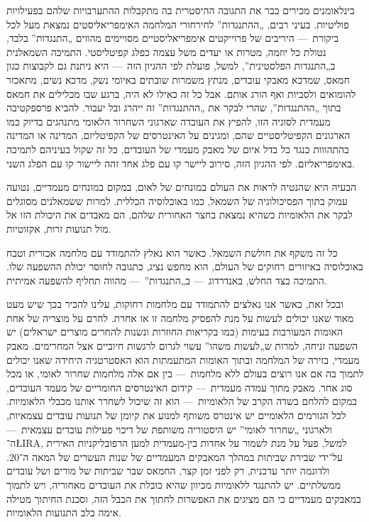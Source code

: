 בינלאומנים מכירים כבר את התגובה ההיסטרית בה מתקבלות ההתערבויות שלהם בפעילויות פוליטיות. בעיני רבים, „ההתנגדות” לחירחורי המלחמה האימפריאליסטים נמצאת מעל לכל ביקורת~— היריבים של פרוייקטים אימפריאליסטיים מסויימים מהווים „התנגדות” בלבד, נטולת כל יוזמה, מטרות או יעדים משל עצמה כפלג קפיטליסטי. התמיכה השמאלנית ב„התנגדות הפלסטינית”, למשל, פועלת לפי ההגיון הזה~— היא ניתנת גם לקבוצות כגון חמאס, שמדכא מאבקי עובדים, מנתץ משמרות שובתים באיומי נשק, מדכא נשים, מתאכזר להומואים ולסביות ואף הורג אותם. אבל כל זה כאילו לא היה, ברגע שבו מכלילים את חמאס בתוך „ההתנגדות”, שהרי לבקר את „ההתנגדות” זה ייהרג ובל יעבור. להביא פרספקטיבה מעמדית לסוגיה הזו, להפיץ את העובדה שארגוני השחרור הלאומי מתנהגים בדיוק כמו הארגונים הקפיטליסטיים שהם, ומגינים על האינטרסים של הקפיטליזם, המדינה או המדינה בהתהווות כנגד כל בדל איום של מאבק מעמדי של העובדים, כל זה שקול בעיניהם לתמיכה באימפריאליזם. לפי ההגיון הזה, סירוב ליישר קו עם פלג אחד זהה ליישור קו עם הפלג השני.

הבעיה היא שהנטיה לראות את העולם במונחים של לאום, במקום במונחים מעמדיים, נטועה עמוק בתוך הפסיכולוגיה של השמאל, כמו באוכלוסיה הכללית. למרות ששמאלנים מסוגלים לבקר את הלאומיות כשהיא נמצאת בחצר האחורית שלהם, הם מאבדים את היכולת הזו אל מול תנועות זרות, אקזוטיות.

כל זה משקף את חולשת השמאל. כאשר הוא נאלץ להתמודד עם מלחמה אכזרית וטבח באוכלוסיה באיזורים רחוקים של העולם, הוא מחפש נציג, כתגובה לחוסר יכולת ההשפעה שלו. התמיכה בצד החלש, באנדרדוג~— ב„התנגדות”~— מהווה תחליף להשפעה אמיתית.

ובכל זאת, כאשר אנו נאלצים להתמודד עם מלחמות רחוקות, עלינו להכיר בכך שיש מעט מאוד שאנו יכולים לעשות על מנת להפסיק מלחמה זו או אחרת. לחרם על מוצריה של אחת האומות המעורבות בעימות (כמו בקריאות החוזרות ונשנות להחרים מוצרים ישראלים) יש השפעה זניחה, למרות ש„לעשות משהו” עשוי לגרום לרגשות חיוביים אצל המחרימים. מאבק מעמדי, בזירה של המלחמה ובתוך האומות המתעמתות הוא האסטרטגיה היחידה שאנו יכולים לתמוך בה אם אנו רוצים בעולם ללא מלחמות~— בין אם אלה מלחמות שחרור לאומי, או מכל סוג אחר. מאבק מתוך עמדה מעמדית~— קידום האינטרסים החומריים של מעמד העובדים, במקום להלחם בשדה הקרב של הלאומיות~— הוא זה שיכול לשחרר אותנו מכבלי הלאומיות. לכל הגורמים הלאומיים יש אינטרס משותף למנוע את קיומן של תנועות עובדים עצמאיות, ולארגוני „שחרור לאומי” יש היסטוריה משותפת של דיכוי פעילות עובדים עצמאית~— ה־\L{IRA}, למשל, פעל על מנת לשמור על אחדות בין-מעמדית למען הרפובליקניות האירית על־ידי שבירת שביתות במהלך המאבקים המעמדיים של שנות העשרים של המאה ה־20. ולדוגמה יותר עדכנית, רק לפני זמן קצר, החמאס שבר שביתות של מורים ושל עובדים ממשלתיים. יש להתנגד ללאומיות מכיוון שהיא כובלת את העובדים מאחוריה, ויש לתמוך במאבקים מעמדיים כי הם מציגים את האפשרות לחתוך את הכבל הזה, וסכנת החיתוך מטילה אימה בלב התנועות הלאומיות.

